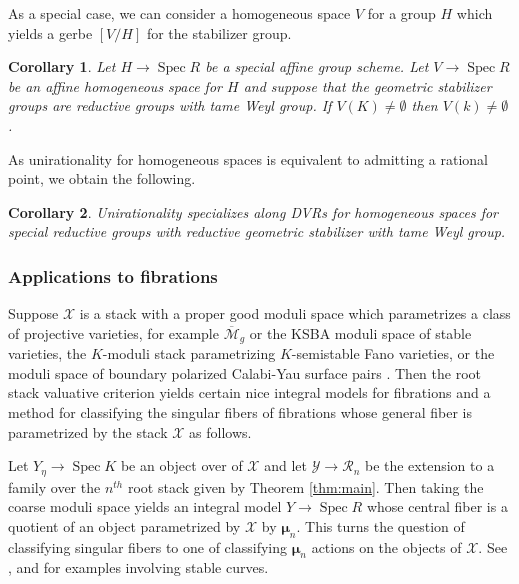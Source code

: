 \documentclass{amsart}
\newtheorem{corollary}[corollary]{Corollary}
\theoremstyle{definition}
\newcommand{\cX}{\mathcal{X}}
\newcommand{\cY}{\mathcal{Y}}
\newcommand{\cR}{\mathcal{R}}
\newcommand{\bmu}{\pmb{\mu}}
\newcommand{\spec}{\operatorname{Spec}}
\begin{document}
As a special case, we can consider a homogeneous space $V$ for a group $H$ which yields a gerbe $[V/H]$ for the stabilizer group.

\begin{corollary}\label{cor:homogeneous_1} Let $H \to \spec R$ be a special affine group scheme. Let $V \to \spec  R$ be an affine homogeneous space for $H$ and suppose that the geometric stabilizer groups are reductive groups with tame Weyl group. If $V(K) \neq \emptyset$ then $V(k) \neq\emptyset$. 
\end{corollary}

\noindent As unirationality for homogeneous spaces is equivalent to admitting a rational point, we obtain the following. 

\begin{corollary}\label{cor:unirationality} Unirationality specializes along DVRs for homogeneous spaces for special reductive groups with reductive geometric stabilizer with tame Weyl group.    
\end{corollary}


\subsubsection{Applications to fibrations}

Suppose $\cX$ is a stack with a proper good moduli space which parametrizes a class of projective varieties, for example $\overline{\mathcal{M}}_g$ or the KSBA moduli space of stable varieties, the $K$-moduli stack parametrizing $K$-semistable Fano varieties, or the moduli space of boundary polarized Calabi-Yau surface pairs \cite{ABBDILW, blum2024goodmodulispacesboundary}. Then the root stack valuative criterion yields certain nice integral models for fibrations and a method for classifying the singular fibers of fibrations whose general fiber is parametrized by the stack $\cX$ as follows. 

Let $Y_\eta \to \spec K$ be an object over of $\cX$ and let $\cY \to \cR_n$ be the extension to a family over the $n^{th}$ root stack given by Theorem \ref{thm:main}. Then taking the coarse moduli space yields an integral model $Y \to \spec R$ whose central fiber is a quotient of an object parametrized by $\cX$ by $\bmu_n$. This turns the question of classifying singular fibers to one of classifying $\bmu_n$ actions on the objects of $\cX$. See \cite{MR3961332}, \cite[Section 7]{bejleri2024heightmodulicyclotomicstacks} and \cite{javier_hyperelliptic} for examples involving stable curves. 
\end{document}
